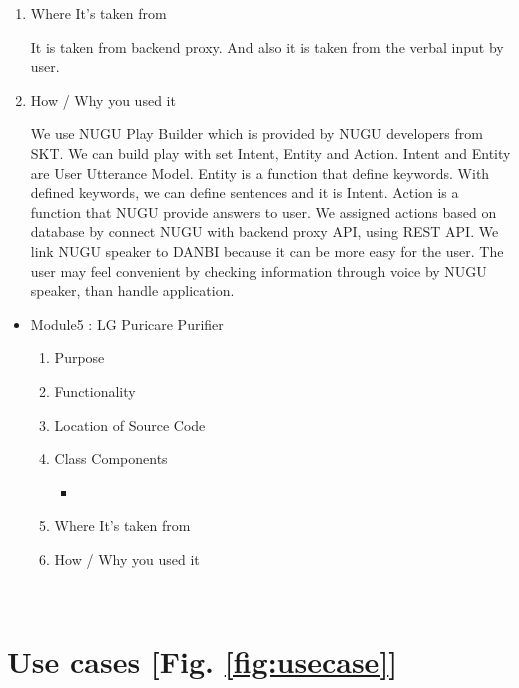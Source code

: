 \documentclass[conference]{IEEEtran}
\begin{document}
\begin{itemize}
\begin{enumerate}
        \item Where It's taken from
        
        It is taken from backend proxy. And also it is taken from the verbal input by user.
        \item How / Why you used it
        
        We use NUGU Play Builder which is provided by NUGU developers from SKT. We can build play with set Intent, Entity and Action. Intent and Entity are User Utterance Model. Entity is a function that define keywords. With defined keywords, we can define sentences and it is Intent. Action is a function that NUGU provide answers to user. We assigned actions based on database by connect NUGU with backend proxy API, using REST API. We link NUGU speaker to DANBI because it can be more easy for the user. The user may feel  convenient by checking information through voice by NUGU speaker, than handle application.
    \end{enumerate}
\end{itemize}

\begin{itemize}
    \item Module5 : LG Puricare Purifier
    \begin{enumerate}
    \setlength{\parindent}{2ex}
    \setlength{\parskip}{0.5em}
        \item Purpose
        
        
        \item Functionality
        
        
        \item Location of Source Code
        
        
        \item Class Components
        \begin{itemize}
            \item 
        \end{itemize}
        
        \item Where It's taken from
        
        
        \item How / Why you used it
        
        
    \end{enumerate}
\end{itemize}

\ 

\section{Use cases [Fig. \ref{fig:usecase}]}
\end{document}
